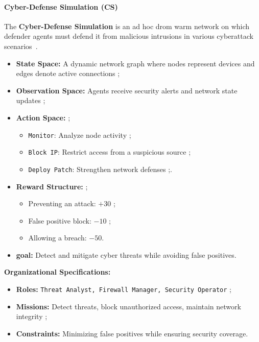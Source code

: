 \documentclass[pdflatex,sn-mathphys-num]{sn-jnl}%
\theoremstyle{thmstyleone}%
\theoremstyle{thmstyletwo}%
\theoremstyle{thmstylethree}%
\begin{document}
\paragraph{Cyber-Defense Simulation (CS)}
The \textbf{Cyber-Defense Simulation} is an ad hoc drom warm network on which defender agents must defend it from malicious intrusions in various cyberattack scenarios~\cite{Maxwell2021}. 

\begin{itemize}
    \item \textbf{State Space:} A dynamic network graph where nodes represent devices and edges denote active connections ;
    \item \textbf{Observation Space:} Agents receive security alerts and network state updates ;
    \item \textbf{Action Space:}  ;
    \begin{itemize}
        \item \texttt{Monitor}: Analyze node activity ;
        \item \texttt{Block IP}: Restrict access from a suspicious source ;
        \item \texttt{Deploy Patch}: Strengthen network defenses ;.
    \end{itemize}
    \item \textbf{Reward Structure:} ;
    \begin{itemize}
        \item Preventing an attack: $+30$ ;
        \item False positive block: $-10$ ;
        \item Allowing a breach: $-50$.
    \end{itemize}
    \item \textbf{goal:} Detect and mitigate cyber threats while avoiding false positives.
\end{itemize}

\textbf{Organizational Specifications:} 
\begin{itemize}
    \item \textbf{Roles:} \texttt{Threat Analyst, Firewall Manager, Security Operator} ;
    \item \textbf{Missions:} Detect threats, block unauthorized access, maintain network integrity ;
    \item \textbf{Constraints:} Minimizing false positives while ensuring security coverage.
\end{itemize}

\bigskip
\end{document}
